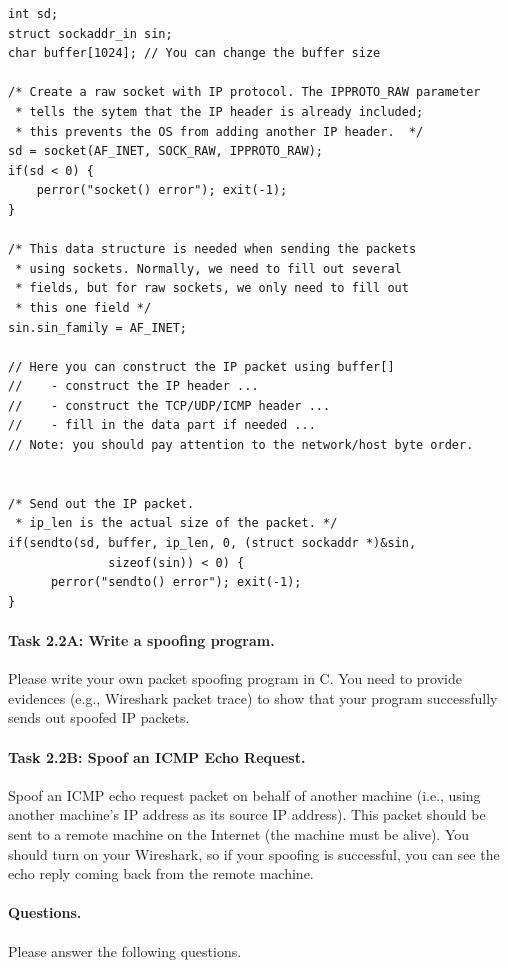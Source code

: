\begin{lstlisting}
int sd;
struct sockaddr_in sin;
char buffer[1024]; // You can change the buffer size

/* Create a raw socket with IP protocol. The IPPROTO_RAW parameter
 * tells the sytem that the IP header is already included;
 * this prevents the OS from adding another IP header.  */
sd = socket(AF_INET, SOCK_RAW, IPPROTO_RAW);
if(sd < 0) {
    perror("socket() error"); exit(-1);
}

/* This data structure is needed when sending the packets 
 * using sockets. Normally, we need to fill out several 
 * fields, but for raw sockets, we only need to fill out
 * this one field */
sin.sin_family = AF_INET;

// Here you can construct the IP packet using buffer[]  
//    - construct the IP header ...
//    - construct the TCP/UDP/ICMP header ...
//    - fill in the data part if needed ...
// Note: you should pay attention to the network/host byte order.


/* Send out the IP packet. 
 * ip_len is the actual size of the packet. */  
if(sendto(sd, buffer, ip_len, 0, (struct sockaddr *)&sin, 
              sizeof(sin)) < 0) {
      perror("sendto() error"); exit(-1);
}
\end{lstlisting}



\paragraph{Task 2.2A: Write a spoofing program.}
Please write your own packet spoofing program in C. You need 
to provide evidences (e.g., Wireshark packet trace) to show that your 
program successfully sends out spoofed IP packets.


\paragraph{Task 2.2B: Spoof an ICMP Echo Request.}
Spoof an ICMP echo request packet on behalf of another machine (i.e., 
using another machine's IP address as its source IP address). This packet 
should be sent to a remote machine on the Internet (the machine must be
alive). You should turn on your Wireshark, so if your spoofing is successful, 
you can see the echo reply coming back from the remote machine. 



\paragraph{Questions.} Please answer the following questions.

